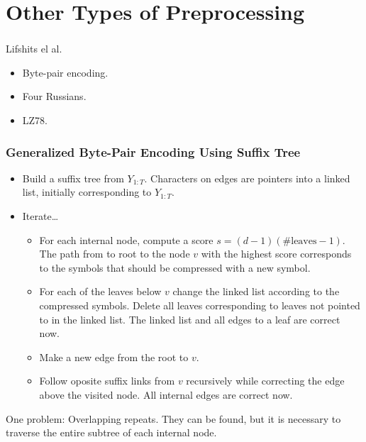 \documentclass[english,notes]{beamer}
\begin{document}
\section{Other Types of Preprocessing}

\begin{frame}
  \frametitle{\insertsection}
  \begin{block}{Lifshits el al.}
    \begin{itemize}
    \item Byte-pair encoding.
    \item Four Russians.
    \item LZ78.
    \end{itemize}
  \end{block}
\end{frame}


\begin{frame}
  \frametitle{Generalized Byte-Pair Encoding Using Suffix Tree}
  \begin{itemize}
  \item Build a suffix tree from $Y_{1:T}$. Characters on edges are pointers
    into a linked list, initially corresponding to $Y_{1:T}$.
  \item Iterate\dots
    \begin{itemize}
    \item For each internal node, compute a score
      $s = (d - 1)(\text{\#leaves} - 1)$. The path from to root to the node
      $v$ with the highest score corresponds to the symbols that should be
      compressed with a new symbol.
    \item For each of the leaves below $v$ change the linked list according to
      the compressed symbols. Delete all leaves corresponding to leaves not
      pointed to in the linked list. The linked list and all edges to a leaf
      are correct now.
    \item Make a new edge from the root to $v$.
    \item Follow oposite suffix links from $v$ recursively while correcting
      the edge above the visited node. All internal edges are correct now.
    \end{itemize}
  \end{itemize}
  One problem: Overlapping repeats. They can be found, but it is necessary to
  traverse the entire subtree of each internal node.
\end{frame}
\end{document}

